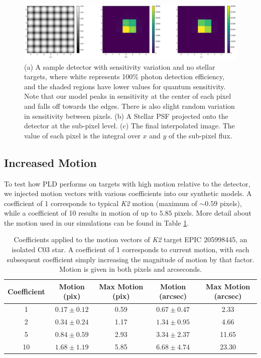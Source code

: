 \documentclass[12pt,preprint]{aastex}
\begin{document}
\begin{figure}[h]
	\centering
	\includegraphics[width=1.0\linewidth]{detector_sensitivity.pdf}
	\caption{(a) A sample detector with sensitivity variation and no stellar targets, where white represents 100\% photon detection efficiency, and the shaded regions have lower values for quantum sensitivity. Note that our model peaks in sensitivity at the center of each pixel and falls off towards the edges. There is also slight random variation in sensitivity between pixels. (b) A Stellar PSF projected onto the detector at the sub-pixel level. (c) The final interpolated image. The value of each pixel is the integral over $x$ and $y$ of the sub-pixel flux.}
	\label{fig:detector_sensitivity}
\end{figure}

\subsection{Increased Motion}

To test how PLD performs on targets with high motion relative to the detector, we injected motion vectors with various coefficients into our synthetic models. A coefficient of 1 corresponds to typical \textit{K2} motion (maximum of $\sim 0.59$ pixels), while a coefficient of 10 results in motion of up to $5.85$ pixels. More detail about the motion used in our simulations can be found in Table \ref{table:motionstatistics}.

\begin{table}[h!]
\begin{center}
    \begin{tabular}{c | c | c | c | c}
        Coefficient & Motion (pix) & Max Motion (pix) & Motion (arcsec) & Max Motion (arcsec) \\
        \hline \hline
        1 & $0.17\pm0.12$ & 0.59 & $0.67\pm0.47$ & 2.33 \\
        2 & $0.34\pm0.24$ & 1.17 & $1.34\pm0.95$ & 4.66 \\
				5 & $0.84\pm0.59$ & 2.93 & $3.34\pm2.37$ & 11.65 \\
				10 & $1.68\pm1.19$ & 5.85 & $6.68\pm4.74$ & 23.30 \\
   \end{tabular}
	 \caption{Coefficients applied to the motion vectors of \textit{K2} target EPIC 205998445, an isolated C03 star. A coefficient of 1 corresponds to current motion, with each subsequent coefficient simply increasing the magnitude of motion by that factor. Motion is given in both pixels and arcseconds.}
	 \label{table:motionstatistics}
\end{center}
\end{table}
\end{document}
